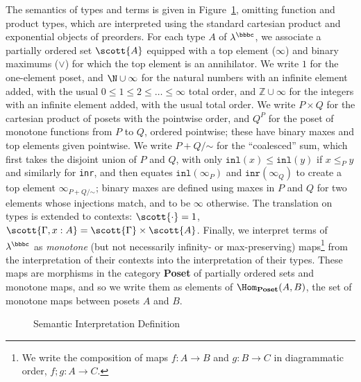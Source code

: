 The semantics of types and terms is given in
Figure~\ref{fig:sem-interp}, omitting function and product types, which are interpreted using the standard cartesian product and exponential objects of preorders.  For each type $A$ of $\lambda^\bbbc$, we
associate a partially ordered set $\scott{A}$ equipped with a top
element ($\infty$) and binary maximums ($\vee$) for which the top
element is an annihilator.
We write $1$ for the one-element poset, and $\N \cup \infty$ for the
natural numbers with an infinite element added, with the usual $0 \le 1
\le 2 \le \ldots \le \infty$ total order, and $\mathbb{Z} \cup \infty$
for the integers with an infinite element added, with the usual total
order.  We write $P \times Q$ for the cartesian product of posets with
the pointwise order, and $Q^P$ for the poset of monotone functions from
$P$ to $Q$, ordered pointwise; these have binary maxes and top elements
given pointwise.  We write $P + Q /\mathord\sim$ for the ``coalesced'' sum,
which first takes the disjoint union of $P$ and $Q$, with only
$\texttt{inl}(x) \le \texttt{inl}(y)$ if $x \le_P y$ and similarly for
\texttt{inr}, and then equates $\texttt{inl}(\infty_P)$ and
$\texttt{inr}(\infty_Q)$ to create a top element $\infty_{P+Q/\mathord\sim}$;
binary maxes are defined using maxes in $P$ and $Q$ for two elements
whose injections match, and to be $\infty$ otherwise.  The translation
on types is extended to contexts: $\scott{\cdot} = 1$,
$\scott{\Gamma,x:A} = \scott{\Gamma} \times \scott{A}$. Finally, we
interpret terms of $\lambda^\bbbc$ as \textit{monotone} (but not
necessarily infinity- or max-preserving) maps\footnote{ We write the
  composition of maps $f : A \to B$ and $g : B \to C$ in diagrammatic
  order, $f ; g : A \to C$.  } from the interpretation of their contexts
into the interpretation of their types. These maps are morphisms in the category
\textbf{Poset} of partially ordered sets and monotone maps, and
so we write them as elements of $\Hom_{\textbf{Poset}}(A,B)$, the
set of monotone maps between posets $A$ and $B$.

\begin{figure}
  
  \caption{Semantic Interpretation Definition}
  \label{fig:sem-interp}
\end{figure}

